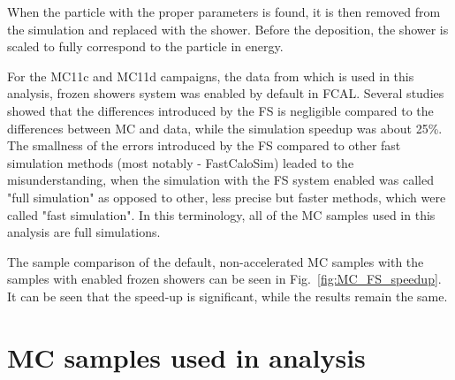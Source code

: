 When the particle with the proper parameters is found, it is then removed from the simulation and replaced with the shower. Before the deposition, the shower is scaled to fully correspond to the particle in energy.

\begin{figure}
\end{figure}

For the MC11c and MC11d campaigns, the data from which is used in this analysis, frozen showers system was enabled by default in FCAL. Several studies showed that the differences introduced by the FS is negligible compared to the differences between MC and data, while the simulation speedup was about 25\%. The smallness of the errors introduced by the FS compared to other fast simulation methods (most notably - FastCaloSim) leaded to the misunderstanding, when the simulation with the FS system enabled was called "full simulation" as opposed to other, less precise but faster methods, which were called "fast simulation". In this terminology, all of the MC samples used in this analysis are full simulations.

The sample comparison of the default, non-accelerated MC samples with the samples with enabled frozen showers can be seen in Fig.~\ref{fig:MC_FS_speedup}. It can be seen that the speed-up is significant, while the results remain the same.

\section{MC samples used in analysis}
\label{sec:MC_periods}

